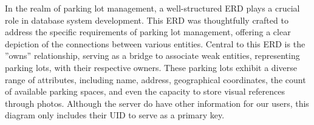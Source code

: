 \begin{figure}[H]
    \centering
    \hspace{1cm}
\end{figure}


In the realm of parking lot management, a well-structured ERD plays a crucial role in database system development. This ERD was thoughtfully crafted to address the specific requirements of parking lot management, offering a clear depiction of the connections between various entities. Central to this ERD is the ”owns” relationship, serving as a bridge to associate weak entities, representing parking lots, with their respective owners. These parking lots exhibit a diverse range of attributes, including name, address, geographical coordinates, the count of available parking spaces, and even the capacity to store visual references through photos. Although the server do have other information for our users, this diagram only includes their UID to serve as a primary key.

